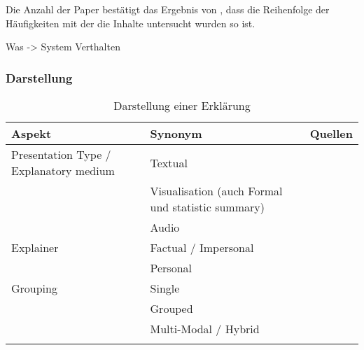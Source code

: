 Die Anzahl der Paper bestätigt das Ergebnis von \cite{chazette_end-users_nodate}, dass die Reihenfolge der Häufigkeiten mit der die Inhalte untersucht wurden so ist.

Was -> System Verthalten

\subsubsection*{Darstellung}

\begin{longtable}{|p{}|p{}|p{}|}
    \hline
    \textbf{Aspekt}     & \textbf{Synonym} & \textbf{Quellen} \\ \hline
    Presentation Type / Explanatory medium
                        & Textual  & \cite{sokol_explainability_2020} \cite{balog_measuring_2020} \cite{tintarev_designing_nodate} \cite{sato_action-triggering_2019} \cite{eiband_impact_2019} \cite{eiband_impact_2019} \cite{abdulrahman_belief-based_2019} \cite{cassens_ambient_2019} \cite{nunes_systematic_2017} \\
                        & Visualisation (auch Formal und statistic summary) & \cite{sokol_explainability_2020} \cite{sato_action-triggering_2019} \cite{sokol_explainability_2020}  \cite{mucha_interfaces_2021} \cite{abdulrahman_belief-based_2019} \cite{nunes_systematic_2017} \cite{schrills_color_2020} \\
                       
                        & Audio & \cite{wiegand2019drive} \cite{nunes_systematic_2017} \cite{wang_is_2018} \\
    \hline
    Explainer           & Factual / Impersonal & \cite{eiband_impact_2019} \cite{abdulrahman_belief-based_2019} \cite{kunkel_let_2019} \cite{neerincx_using_2018} \\
                        & Personal & \cite{abdulrahman_belief-based_2019} \cite{kunkel_let_2019} \cite{weitz_you_2019} \cite{zahedi_towards_2019} \cite{neerincx_using_2018} \\
    \hline
    Grouping            & Single & \cite{nunes_systematic_2017} \cite{balog_measuring_2020} \cite{sato_action-triggering_2019} \cite{eiband_impact_2019} \cite{abdulrahman_belief-based_2019} \\
                        & Grouped & \cite{nunes_systematic_2017} \cite{balog_measuring_2020} \cite{tintarev_designing_nodate}  \\
                        & Multi-Modal / Hybrid & \cite{sato_action-triggering_2019} \cite{abdulrahman_belief-based_2019} \cite{cassens_ambient_2019} \\
    \hline
\caption{Darstellung einer Erklärung}
\label{tab:presentation_of_explanations}
\end{longtable}